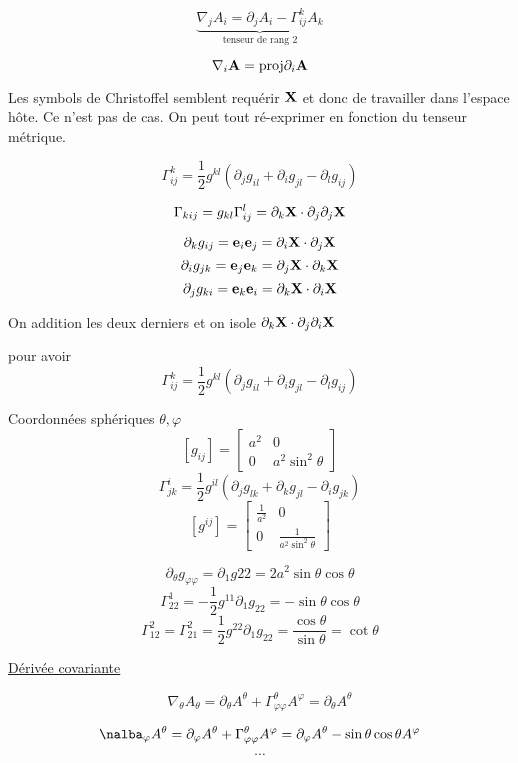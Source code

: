 $$\underbrace{\boxed{\nabla_j A_i = \partial_j A_i - \Gamma_{ij}^{k}A_k}}_{\text{tenseur de rang 2} } $$ 


$$\nabla_i \vb{A} = \text{proj} \partial_i \vb{A} $$ 

\begin{tcolorbox}[title=]
    Les symbols de Christoffel semblent requérir $\vb{X}$ et donc de travailler dans l'espace hôte. Ce n'est pas de cas. On peut tout ré-exprimer en fonction du tenseur métrique.

    $$\Gamma_{ij}^{k}= \frac{1}{2} g^{kl} \left( \partial_j g_{il} +\partial_i g_{jl} - \partial_{l} g_{ij}   \right) $$ 
\end{tcolorbox}


$$\Gamma_{kij} = g_{kl} \Gamma_{ij}^{l} = \partial_k \vb{X}\cdot \partial_j \partial_j \vb{X}$$ 

$$\partial_k g_{ij} = \vb{e}_i \vb{e}_j = \partial_i \vb{X}\cdot \partial_j \vb{X} $$ 
$$\partial_i g_{jk} = \vb{e}_j \vb{e}_k = \partial_j \vb{X}\cdot \partial_k \vb{X} $$ 
$$\partial_j g_{ki} = \vb{e}_k \vb{e}_i = \partial_k \vb{X}\cdot \partial_i \vb{X} $$ 

On addition les deux derniers et on isole $\partial_k \vb{X}\cdot \partial_j \partial_i \vb{X}$ 

pour avoir $$\boxed{\Gamma_{ij}^{k}= \frac{1}{2} g^{kl} \left( \partial_j g_{il} +\partial_i g_{jl} - \partial_{l} g_{ij}   \right)}$$


\begin{tcolorbox}[title=Exemple: $S^{2}$( rayon $a$  ) ]
     Coordonnées sphériques $\theta, \varphi$ 
     $$[g_{ij} ]= \begin{bmatrix} a^{2}& 0 \\ 0 &a^2\sin^2\theta
     \end{bmatrix}$$ 
     $$\Gamma_{jk}^{i}= \frac{1}{2} g^{il} \left( \partial_j g_{lk} +\partial_k g_{jl} - \partial_i g_{jk}  \right) $$ 
         $$[g^{ij}]= \begin{bmatrix} \frac{1}{a^{2}} &0 \\ 0 & \frac{1}{a^2\sin^2\theta}  
         
     \end{bmatrix}$$ 

$$\partial_{\theta} g_{\varphi\varphi} = \partial_1 g22 = 2 a^2\sin\theta\cos\theta$$ 
$$\Gamma_{22}^{1}= - \frac{1}{2} g^{11}\partial_1 g_{22} =- \sin\theta\cos\theta$$ 
$$\Gamma_{12}^{2}= \Gamma_{21}^{2}= \frac{1}{2} g^{22}\partial_1 g_{22} = \frac{\cos\theta}{\sin\theta} = \cot\theta$$ 


\underline{Dérivée covariante} 

$$\nabla_{\theta} A_{\theta} = \partial_{\theta} A^{\theta}+ \Gamma_{\varphi\varphi}^{\theta}A^{\varphi}= \partial_{\theta} A^{\theta}$$ 

$$\nalba_{\varphi} A^{\theta}= \partial_{\varphi} A^{\theta}+ \Gamma_{\varphi\varphi}^{\theta}A^{\varphi}= \partial_{\varphi} A^{\theta}-\sin\theta\cos\theta A^\varphi$$ 
$$\dotsb$$ 
\end{tcolorbox}

